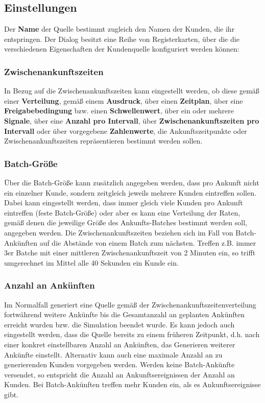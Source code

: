 \subsection*{Einstellungen}

Der \textbf{Name} der Quelle bestimmt zugleich den Namen der Kunden, die ihr entspringen.
Der Dialog besitzt eine Reihe von Registerkarten, über die die verschiedenen Eigenschaften
der Kundenquelle konfiguriert werden können:

\subsubsection*{Zwischenankunftszeiten}

In Bezug auf die Zwischenankunftszeiten kann eingestellt werden, ob diese gemäß einer
\textbf{Verteilung}, gemäß einem \textbf{Ausdruck}, über einen \textbf{Zeitplan}, über eine
\textbf{Freigabebedingung} bzw. einen \textbf{Schwellenwert}, über ein oder mehrere
\textbf{Signale}, über eine \textbf{Anzahl pro Intervall}, über \textbf{Zwischenankunftszeiten pro Intervall}
oder über vorgegebene \textbf{Zahlenwerte}, die Ankunftszeitpunkte oder Zwischenankunftszeiten
repräsentieren bestimmt werden sollen.

\subsubsection*{Batch-Größe}

Über die Batch-Größe kann zusätzlich
angegeben werden, dass pro Ankunft nicht ein einzelner Kunde, sondern zeitgleich jeweils
mehrere Kunden eintreffen sollen. Dabei kann eingestellt werden, dass immer gleich
viele Kunden pro Ankunft eintreffen (feste Batch-Größe) oder aber es kann eine Verteilung
der Raten, gemäß denen die jeweilige Größe des Ankunfts-Batches bestimmt werden soll,
angegeben werden.
Die Zwischenankunftszeiten beziehen sich im Fall von Batch-Ankünften auf die Abstände von
einem Batch zum nächsten. Treffen z.B. immer 3er Batche mit einer mittleren Zwischenankunftszeit
von 2 Minuten ein, so trifft umgerechnet im Mittel alle 40 Sekunden ein Kunde ein.

\subsubsection*{Anzahl an Ankünften}

Im Normalfall generiert eine Quelle gemäß der Zwischenankunftszeitenverteilung fortwährend
weitere Ankünfte bis die Gesamtanzahl an geplanten Ankünften erreicht wurden bzw. die Simulation beendet wurde.
Es kann jedoch auch eingestellt werden, dass die Quelle bereits zu einem früheren Zeitpunkt,
d.h. nach einer konkret einstellbaren Anzahl an Ankünften, das Generieren weiterer Ankünfte einstellt.
Alternativ kann auch eine maximale Anzahl an zu generierenden Kunden vorgegeben werden.
Werden keine Batch-Ankünfte versendet, so entspricht die Anzahl an Ankunftsereignissen der
Anzahl an Kunden. Bei Batch-Ankünften treffen mehr Kunden ein, als es Ankunftsereignisse gibt.

